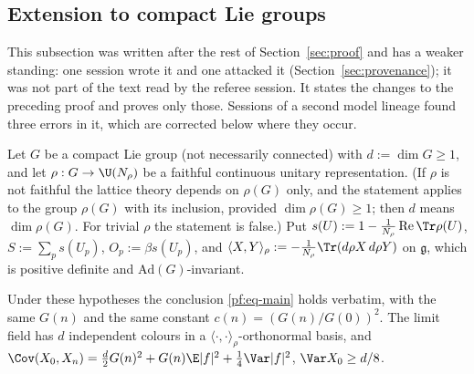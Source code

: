 \subsection{Extension to compact Lie groups}\label{gen:sec}

This subsection was written after the rest of Section~\ref{sec:proof} and has a weaker standing: one session wrote it and one attacked it (Section~\ref{sec:provenance}); it was not part of the text read by the referee session. It states the changes to the preceding proof and proves only those. Sessions of a second model lineage found three errors in it, which are corrected below where they occur.


Let $G$ be a compact Lie group (not necessarily connected) with $d:=\dim G\ge1$, and let $\rho:G\to\U(N_\rho)$ be a faithful continuous unitary representation. (If $\rho$ is not faithful the lattice theory depends on $\rho(G)$ only, and the statement applies to the group $\rho(G)$ with its inclusion, provided $\dim\rho(G)\ge1$; then $d$ means $\dim\rho(G)$. For trivial $\rho$ the statement is false.) Put $s(U):=1-\frac1{N_\rho}\operatorname{Re}\Tr\rho(U)$, $S:=\sum_ps(U_p)$, $O_p:=\beta s(U_p)$, and $\langle X,Y\rangle_\rho:=-\frac1{N_\rho}\Tr(d\rho X\,d\rho Y)$ on $\mathfrak g$, which is positive definite and $\mathrm{Ad}(G)$-invariant.

\begin{theorem}\label{gen:thm}
Under these hypotheses the conclusion \eqref{pf:eq-main} holds verbatim, with the same $G(n)$ and the same constant $c(n)=(G(n)/G(0))^2$. The limit field has $d$ independent colours in a $\langle\cdot,\cdot\rangle_\rho$-orthonormal basis, and $\Cov(X_0,X_n)=\frac d2G(n)^2+G(n)\E|f|^2+\frac14\Var|f|^2$, $\Var X_0\ge d/8$.
\end{theorem}

